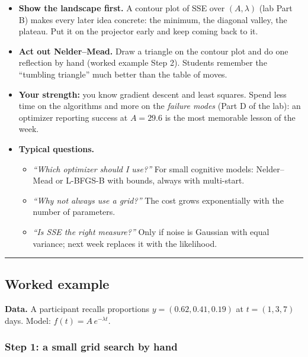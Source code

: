 \begin{itemize}
\tightlist
\item
  \textbf{Show the landscape first.} A contour plot of SSE over
  \((A, \lambda)\) (lab Part B) makes every later idea concrete: the
  minimum, the diagonal valley, the plateau. Put it on the projector
  early and keep coming back to it.
\item
  \textbf{Act out Nelder--Mead.} Draw a triangle on the contour plot and
  do one reflection by hand (worked example Step 2). Students remember
  the ``tumbling triangle'' much better than the table of moves.
\item
  \textbf{Your strength:} you know gradient descent and least squares.
  Spend less time on the algorithms and more on the \emph{failure modes}
  (Part D of the lab): an optimizer reporting success at \(A = 29.6\) is
  the most memorable lesson of the week.
\item
  \textbf{Typical questions.}

  \begin{itemize}
  \tightlist
  \item
    \emph{``Which optimizer should I use?''} For small cognitive models:
    Nelder--Mead or L-BFGS-B with bounds, always with multi-start.
  \item
    \emph{``Why not always use a grid?''} The cost grows exponentially
    with the number of parameters.
  \item
    \emph{``Is SSE the right measure?''} Only if noise is Gaussian with
    equal variance; next week replaces it with the likelihood.
  \end{itemize}
\end{itemize}

\begin{center}\rule{0.5\linewidth}{0.5pt}\end{center}

\subsection{Worked example}

\textbf{Data.} A participant recalls proportions
\(y = (0.62, 0.41, 0.19)\) at \(t = (1, 3, 7)\) days. Model:
\(f(t) = A\,e^{-\lambda t}\).

\subsubsection{Step 1: a small grid search by hand}

